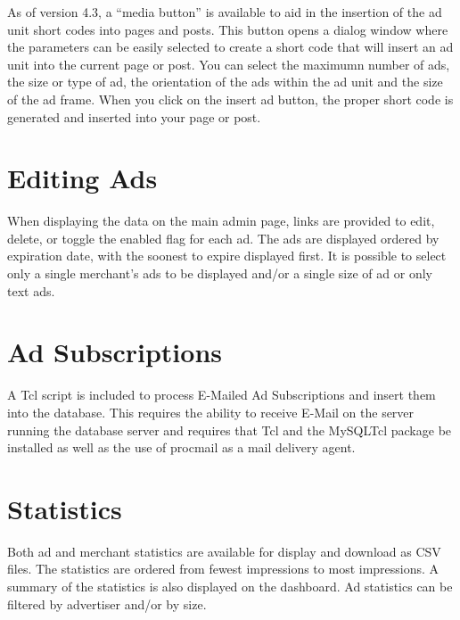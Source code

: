 \documentclass[letterpaper]{article}
\begin{document}
As of version 4.3, a ``media button'' is available to aid in the
insertion of the ad unit short codes into pages and posts.  This button
opens a dialog window where the parameters can be easily selected to
create a short code that will insert an ad unit into the current page or
post. You can select the maximumn number of ads, the size or type of ad,
the orientation of the ads within the ad unit and the size of the ad
frame. When you click on the insert ad button, the proper short code is
generated and inserted into your page or post.

\section{Editing Ads}

When displaying the data on the main admin page, links are provided
to edit, delete, or toggle the enabled flag for each ad. The ads are
displayed ordered by expiration date, with the soonest to expire
displayed first. It is possible to select only a single merchant's ads
to be displayed and/or a single size of ad or only text ads.

\section{Ad Subscriptions}

A Tcl script is included to process E-Mailed Ad Subscriptions and
insert them into the database.  This requires the ability to receive
E-Mail on the server running the database server and requires that Tcl
and the MySQLTcl package be installed as well as the use of procmail as
a mail delivery agent.

\section{Statistics}

Both ad and merchant statistics are available for display and download
as CSV files.  The statistics are ordered from fewest impressions to
most impressions. A summary of the statistics is also displayed on the
dashboard.  Ad statistics can be filtered by advertiser and/or by size.
\end{document}
